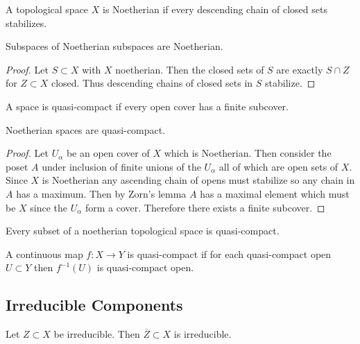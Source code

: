 \documentclass[12pt]{article}
\begin{document}
\begin{defn}
A topological space $X$ is Noetherian if every descending chain of closed sets stabilizes.
\end{defn}

\begin{lemma}
Subspaces of Noetherian subspaces are Noetherian.
\end{lemma}

\begin{proof}
Let $S \subset X$ with $X$ noetherian. Then the closed sets of $S$ are exactly $S \cap Z$ for $Z \subset X$ closed. Thus descending chains of closed sets in $S$ stabilize.
\end{proof}

\begin{defn}
A space is quasi-compact if every open cover has a finite subcover.
\end{defn}

\begin{lemma}
Noetherian spaces are quasi-compact. 
\end{lemma}

\begin{proof}
Let $U_{\alpha}$ be an open cover of $X$ which is Noetherian. Then consider the poset $A$ under inclusion of finite unions of the $U_\alpha$ all of which are open sets of $X$. Since $X$ is Noetherian any ascending chain of opens must stabilize so any chain in $A$ has a maximum. Then by Zorn's lemma $A$ has a maximal element which must be $X$ since the $U_\alpha$ form a cover. Therefore there exists a finite subcover.
\end{proof}

\begin{cor}
Every subset of a noetherian topological space is quasi-compact.
\end{cor}

\begin{defn}
A continuous map $f : X \to Y$ is quasi-compact if for each quasi-compact open $U \subset Y$ then $f^{-1}(U)$ is quasi-compact open.
\end{defn}

\subsection{Irreducible Components}

\begin{lemma}
Let $Z \subset X$ be irreducible. Then $\overline{Z} \subset X$ is irreducible.
\end{lemma}
\end{document}
